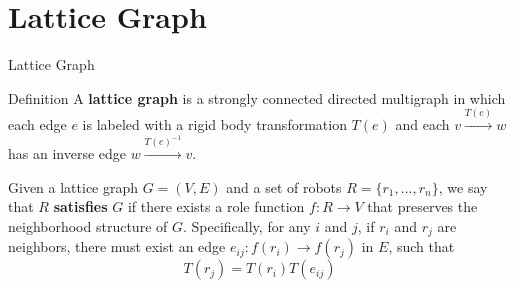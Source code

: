 \documentclass[10pt]{beamer}
\newcommand{\edge}[3]{{#1}\overset{#2}{\longrightarrow}{#3}}
\begin{document}
\section{Lattice Graph}
\begin{frame}{Lattice Graph}
    \begin{bclogo}[couleur=orange!10, arrondi=0.2, ombre=true]{Definition}
      A \textbf{lattice graph} is a strongly connected directed
      multigraph in which each edge $e$ is labeled with a rigid body
      transformation $T(e)$ and each $\edge{v}{T(e)}{w}$ has an
      inverse edge $\edge{w}{T(e)^{-1}}{v}$.  
    \end{bclogo}
    \begin{block}{}
      Given a lattice graph $G=(V, E)$ and a set of robots $R = \{
      r_1, \ldots, r_n \}$, we say that $R$ \textbf{satisfies} $G$ if
      there exists a role function $f: R \rightarrow V$ that preserves
      the neighborhood structure of $G$.
      Specifically, for any $i$ and $j$, if $r_i$ and $r_j$ are neighbors, 
      there must exist an edge
      $e_{ij}: \edge{f(r_i)}{}{f(r_j)}$ in $E$, such that
      $$ T(r_j) = T(r_i) T(e_{ij})$$
  \end{block}
\end{frame}
\end{document}
